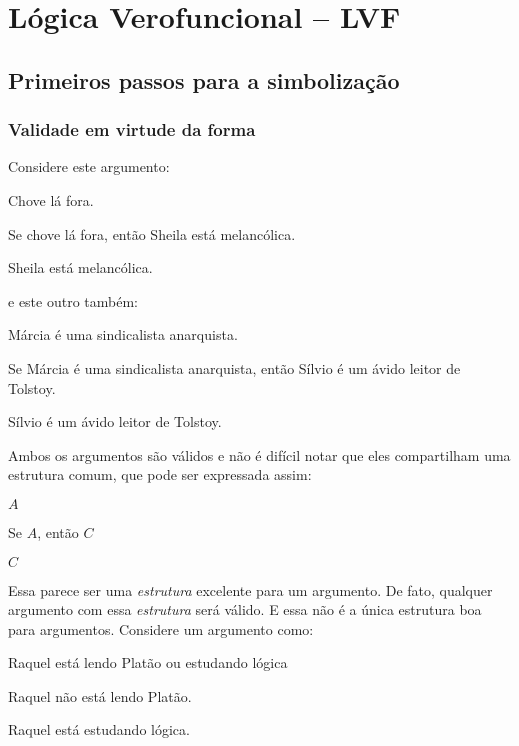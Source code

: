 \normalsize
\part{Lógica Verofuncional -- LVF}
\label{ch.TFL}

\chapter{Primeiros passos para a simbolização}

\section{Validade em  virtude da forma}\label{s:ValidityInVirtueOfForm}
Considere este argumento:
	\begin{earg}
		\item[] Chove lá fora.
		\item[] Se chove lá fora, então Sheila está melancólica.
		\item[\therefore] Sheila está melancólica.
	\end{earg}
e este outro também:
	\begin{earg}
		\item[] Márcia é uma sindicalista anarquista.
		\item[] Se Márcia é uma sindicalista anarquista, então Sílvio é um ávido leitor de Tolstoy.
		\item[\therefore] Sílvio é um ávido leitor de Tolstoy.
	\end{earg}
Ambos os argumentos são válidos e não é difícil notar que eles compartilham uma estrutura comum, que pode ser expressada assim:
	\begin{earg}
		\item[] $A$
		\item[] Se $A$, então $C$
		\item[\therefore] $C$
	\end{earg}
Essa parece ser uma \emph{estrutura} excelente para um argumento.
De fato, qualquer argumento com essa \emph{estrutura} será válido.
E essa não é a única estrutura boa para argumentos.
Considere um argumento como:
	\begin{earg}
		\item[] Raquel está lendo Platão ou estudando lógica
		\item[] Raquel não está lendo Platão.
		\item[\therefore] Raquel está estudando lógica.
	\end{earg}
